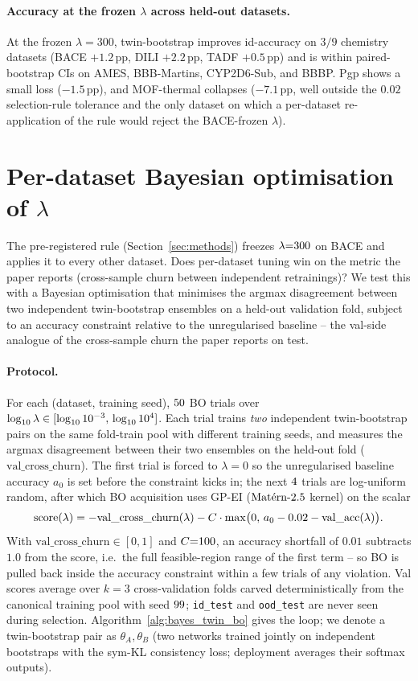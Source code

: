 \paragraph{Accuracy at the frozen $\lambda$ across held-out datasets.}
At the frozen $\lambda{=}300$, twin-bootstrap improves id-accuracy on
$3/9$ chemistry datasets (BACE $+1.2$\,pp, DILI $+2.2$\,pp, TADF
$+0.5$\,pp) and is within paired-bootstrap CIs on AMES, BBB-Martins,
CYP2D6-Sub, and BBBP.  Pgp shows a small loss ($-1.5$\,pp), and
MOF-thermal collapses ($-7.1$\,pp, well outside the $0.02$ selection-rule
tolerance and the only dataset on which a per-dataset re-application of
the rule would reject the BACE-frozen $\lambda$).

\section{\boldmath Per-dataset Bayesian optimisation of $\lambda$}
\label{app:bayes_twin}

The pre-registered rule (Section~\ref{sec:methods}) freezes
$\lambda{=}300$ on BACE and applies it to every other
dataset.  Does per-dataset tuning win on the metric the paper reports
(cross-sample churn between independent retrainings)?  We test this
with a Bayesian optimisation that minimises the argmax disagreement
between two independent twin-bootstrap ensembles on a held-out
validation fold, subject to an accuracy constraint relative to the
unregularised baseline -- the val-side analogue of the cross-sample
churn the paper reports on test.

\paragraph{Protocol.}
For each (dataset, training seed), $50$ BO trials over
$\log_{10}\lambda \in [\log_{10}10^{-3},\,
\log_{10}10^{4}]$.  Each trial trains \emph{two}
independent twin-bootstrap pairs on the same fold-train pool with
different training seeds, and measures the argmax disagreement
between their two ensembles on the held-out fold
($\text{val\_cross\_churn}$).  The first trial is forced to
$\lambda{=}0$ so the unregularised baseline accuracy $a_0$ is set
before the constraint kicks in; the next $4$ trials
are log-uniform random, after which BO acquisition uses GP-EI
($\textrm{Mat\'ern-2.5}$ kernel) on the scalar
\[
  \text{score}(\lambda) = -\text{val\_cross\_churn}(\lambda)
    - C\cdot\max\bigl(0,\, a_0 - 0.02 - \text{val\_acc}(\lambda)\bigr).
\]
With $\text{val\_cross\_churn} \in [0,1]$ and $C{=}100$,
an accuracy shortfall of $0.01$ subtracts $1.0$ from the score, i.e.\
the full feasible-region range of the first term -- so BO is pulled
back inside the accuracy constraint within a few trials of any
violation.  Val scores average over $k{=}3$ cross-validation folds
carved deterministically from the canonical training pool with seed
$99$; \texttt{id\_test} and \texttt{ood\_test} are never
seen during selection.  Algorithm~\ref{alg:bayes_twin_bo} gives the
loop; we denote a twin-bootstrap pair as $\theta_A, \theta_B$ (two
networks trained jointly on independent bootstraps with the sym-KL
consistency loss; deployment averages their softmax outputs).

